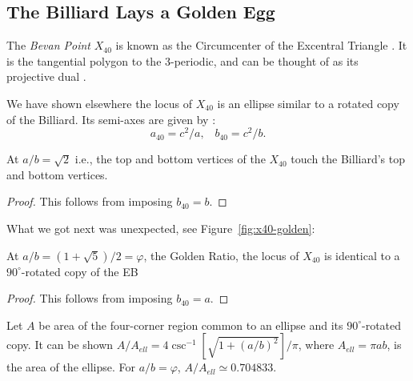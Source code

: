 \subsection{The Billiard Lays a Golden Egg}
\label{sec:x40}

The {\em Bevan Point} $X_{40}$ is known as the Circumcenter of the Excentral Triangle \cite{etc}. It is the tangential polygon to the 3-periodic, and can be thought of as its projective dual \cite{levi2007-poncelet-grid}.

We have shown elsewhere the locus of $X_{40}$ is an ellipse similar to a rotated copy of the Billiard. Its semi-axes are given by \cite{garcia2020-ellipses}:
%
\begin{equation*}
    a_{40}=c^2/a,\;\;\; b_{40}=c^2/b.
\end{equation*}
%
\begin{proposition}
At $a/b=\sqrt{2}$ i.e., the top and bottom vertices of the $X_{40}$ touch the Billiard's top and bottom vertices.
\end{proposition}

\begin{proof}
This follows from imposing $b_{40}=b$.
\end{proof}

\noindent What we got next was unexpected, see Figure~\ref{fig:x40-golden}:

\begin{proposition}
At $a/b = (1+\sqrt{5})/2=\varphi$, the Golden Ratio, the locus of $X_{40}$ is identical to a $90^\circ$-rotated copy of the EB
\end{proposition}

\begin{proof}
This follows from imposing $b_{40} = a$.
\end{proof}

\begin{remark}
Let $A$ be area of the four-corner region common to an ellipse and its $90^\circ$-rotated copy. It can be shown $A/A_{ell}=4 \csc^{-1}\left[{\sqrt{1 + (a/b)^2}}\right]/\pi$, where $A_{ell}=\pi{a}{b}$, is the area of the ellipse. For $a/b=\varphi$, $A/A_{ell}{\simeq}0.704833$.
\end{remark}

